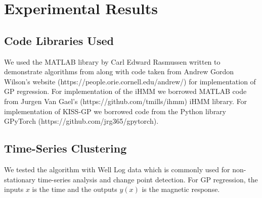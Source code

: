 \documentclass{article}
\begin{document}
\section{Experimental Results}

\subsection{Code Libraries Used}

We used the MATLAB library by Carl Edward Rasmussen written to demonstrate algorithms from \cite{GPML} along with code taken from Andrew Gordon Wilson's website (https://people.orie.cornell.edu/andrew/) for implementation of GP regression. For implementation of the iHMM we borrowed MATLAB code from Jurgen Van Gael's (https://github.com/tmills/ihmm) iHMM library. For implementation of KISS-GP we borrowed code from the Python library GPyTorch (https://github.com/jrg365/gpytorch).

\subsection{Time-Series Clustering}

We tested the algorithm with Well Log data \cite{WellLog} which is commonly used for non-stationary time-series analysis and change point detection. For GP regression, the inputs $x$ is the time and the outputs $y(x)$ is the magnetic response.
\end{document}
